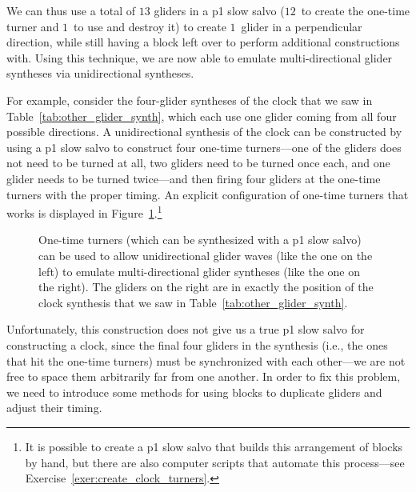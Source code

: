 We can thus use a total of $13$ gliders in a p1 slow salvo ($12$~to create the one-time turner and $1$~to use and destroy it) to create $1$~glider in a perpendicular direction, while still having a block left over to perform additional constructions with. Using this technique, we are now able to emulate multi-directional glider syntheses via unidirectional syntheses.

For example, consider the four-glider syntheses of the clock that we saw in Table~\ref{tab:other_glider_synth}, which each use one glider coming from all four possible directions. A unidirectional synthesis of the clock can be constructed by using a p1 slow salvo to construct four one-time turners---one of the gliders does not need to be turned at all, two gliders need to be turned once each, and one glider needs to be turned twice---and then firing four gliders at the one-time turners with the proper timing. An explicit configuration of one-time turners that works is displayed in Figure~\ref{fig:unidirection_clock_synthesis}.\footnote{It is possible to create a p1 slow salvo that builds this arrangement of blocks by hand, but there are also computer scripts that automate this process---see Exercise~\ref{exer:create_clock_turners}.}

\begin{figure}[!htb]
	\centering{}
	\caption{One-time turners (which can be synthesized with a p1 slow salvo) can be used to allow unidirectional glider waves (like the one on the left) to emulate multi-directional glider syntheses (like the one on the right). The gliders on the right are in exactly the position of the clock synthesis that we saw in Table~\ref{tab:other_glider_synth}.}\label{fig:unidirection_clock_synthesis}
\end{figure}

Unfortunately, this construction does not give us a true p1 slow salvo for constructing a clock, since the final four gliders in the synthesis (i.e., the ones that hit the one-time turners) must be synchronized with each other---we are not free to space them arbitrarily far from one another. In order to fix this problem, we need to introduce some methods for using blocks to duplicate gliders and adjust their timing.


